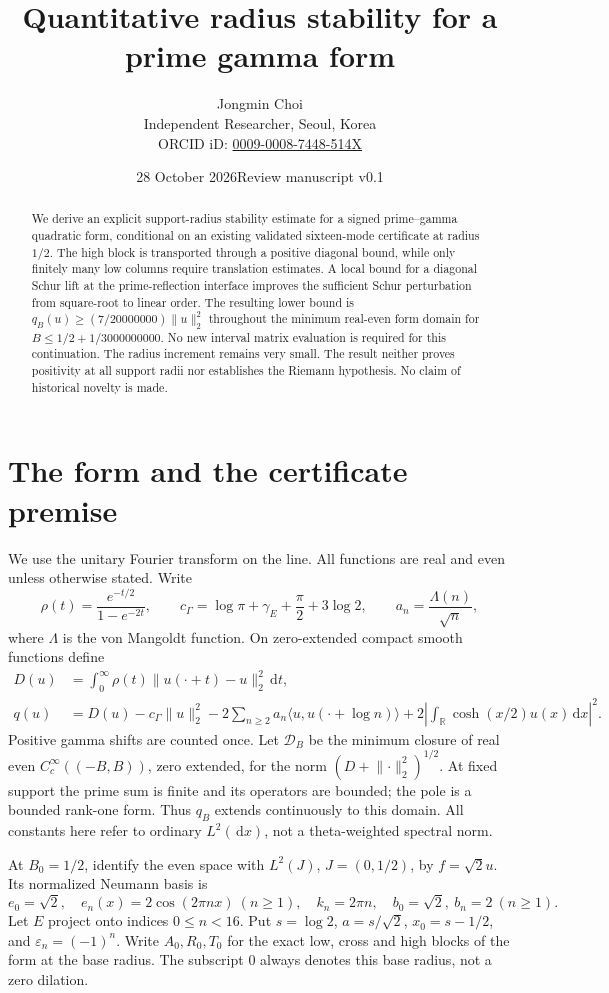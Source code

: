 \documentclass[11pt]{article}
\title{Quantitative radius stability for a prime gamma form}
\author{Jongmin Choi\\Independent Researcher, Seoul, Korea\\ORCID iD: \href{https://orcid.org/0009-0008-7448-514X}{0009-0008-7448-514X}}
\date{28 October 2026\quad Review manuscript v0.1}
\newcommand{\R}{\mathbb R}
\newcommand{\dd}{\,\mathrm d}
\newcommand{\norm}[1]{\lVert#1\rVert}
\begin{document}
\maketitle
\begin{abstract}
We derive an explicit support-radius stability estimate for a signed
prime--gamma quadratic form, conditional on an existing validated
sixteen-mode certificate at radius $1/2$. The high block is transported
through a positive diagonal bound, while only finitely many low columns
require translation estimates. A local bound for a diagonal Schur lift
at the prime-reflection interface improves the sufficient Schur
perturbation from square-root to linear order. The resulting lower bound
is $q_B(u)\ge (7/20000000)\norm u_2^2$ throughout the minimum real-even
form domain for $B\le1/2+1/3000000000$. No new interval matrix evaluation
is required for this continuation. The radius increment remains very
small. The result neither proves positivity at all support radii nor
establishes the Riemann hypothesis. No claim of historical novelty is made.
\end{abstract}

\section{The form and the certificate premise}
We use the unitary Fourier transform on the line. All functions are real
and even unless otherwise stated. Write
\[
 \rho(t)=\frac{e^{-t/2}}{1-e^{-2t}},\qquad
 c_\Gamma=\log\pi+\gamma_E+\frac\pi2+3\log2,\qquad
 a_n=\frac{\Lambda(n)}{\sqrt n},
\]
where $\Lambda$ is the von Mangoldt function. On zero-extended compact
smooth functions define
\begin{align}
 D(u)&=\int_0^\infty\rho(t)\norm{u(\cdot+t)-u}_2^2\dd t,\nonumber\\
 q(u)&=D(u)-c_\Gamma\norm u_2^2
 -2\sum_{n\ge2}a_n\langle u,u(\cdot+\log n)\rangle
 +2\left|\int_\R\cosh(x/2)u(x)\dd x\right|^2.
 \label{eq:form}
\end{align}
Positive gamma shifts are counted once. Let $\mathcal D_B$ be the minimum
closure of real even $C_c^\infty((-B,B))$, zero extended, for the norm
$(D+\norm{\cdot}_2^2)^{1/2}$. At fixed support the prime sum is finite
and its operators are bounded; the pole is a bounded rank-one form.
Thus $q_B$ extends continuously to this domain. All constants here refer
to ordinary $L^2(\dd x)$, not a theta-weighted spectral norm.

At $B_0=1/2$, identify the even space with $L^2(J)$, $J=(0,1/2)$,
by $f=\sqrt2u$. Its normalized Neumann basis is
\[
 e_0=\sqrt2,\quad e_n(x)=2\cos(2\pi nx)\ (n\ge1),\quad
 k_n=2\pi n,\quad b_0=\sqrt2,\ b_n=2\ (n\ge1).
\]
Let $E$ project onto indices $0\le n<16$. Put $s=\log2$, $a=s/\sqrt2$,
$x_0=s-1/2$, and $\varepsilon_n=(-1)^n$. Write $A_0,R_0,T_0$ for the
exact low, cross and high blocks of the form at the base radius.
The subscript $0$ always denotes this base radius, not a zero dilation.
\end{document}
